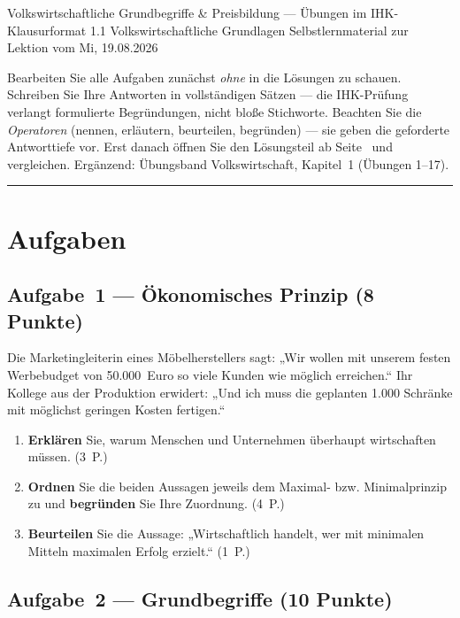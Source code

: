 \documentclass[11pt, a4paper]{article}
\begin{document}
%
  {Volkswirtschaftliche Grundbegriffe \& Preisbildung --- Übungen im IHK-Klausurformat}%
  {1.1 Volkswirtschaftliche Grundlagen}%
  {Selbstlernmaterial zur Lektion vom Mi, 19.08.2026}


\begin{merksatz}[title={\bfseries So nutzen Sie dieses Aufgabenheft}]
Bearbeiten Sie alle Aufgaben zunächst \emph{ohne} in die Lösungen zu schauen. Schreiben
Sie Ihre Antworten in vollständigen Sätzen --- die IHK-Prüfung verlangt formulierte
Begründungen, nicht bloße Stichworte. Beachten Sie die \emph{Operatoren} (nennen,
erläutern, beurteilen, begründen) --- sie geben die geforderte Antworttiefe vor.
Erst danach öffnen Sie den Lösungsteil ab Seite~\pageref{loesungen} und vergleichen.
Ergänzend: Übungsband Volkswirtschaft, Kapitel~1 (Übungen 1--17).
\end{merksatz}

\tableofcontents
\vspace{1em}
\hrule

\section{Aufgaben}

\subsection*{Aufgabe~1 --- Ökonomisches Prinzip (8 Punkte)}

Die Marketingleiterin eines Möbelherstellers sagt: „Wir wollen mit unserem festen
Werbebudget von 50.000~Euro so viele Kunden wie möglich erreichen.`` Ihr Kollege aus der
Produktion erwidert: „Und ich muss die geplanten 1.000 Schränke mit möglichst geringen
Kosten fertigen.``

\begin{enumerate}[label=(\alph*)]
  \item \textbf{Erklären} Sie, warum Menschen und Unternehmen überhaupt wirtschaften müssen. \hfill (3~P.)
  \item \textbf{Ordnen} Sie die beiden Aussagen jeweils dem Maximal- bzw. Minimalprinzip zu und \textbf{begründen} Sie Ihre Zuordnung. \hfill (4~P.)
  \item \textbf{Beurteilen} Sie die Aussage: „Wirtschaftlich handelt, wer mit minimalen Mitteln maximalen Erfolg erzielt.`` \hfill (1~P.)
\end{enumerate}

\subsection*{Aufgabe~2 --- Grundbegriffe (10 Punkte)}
\end{document}
